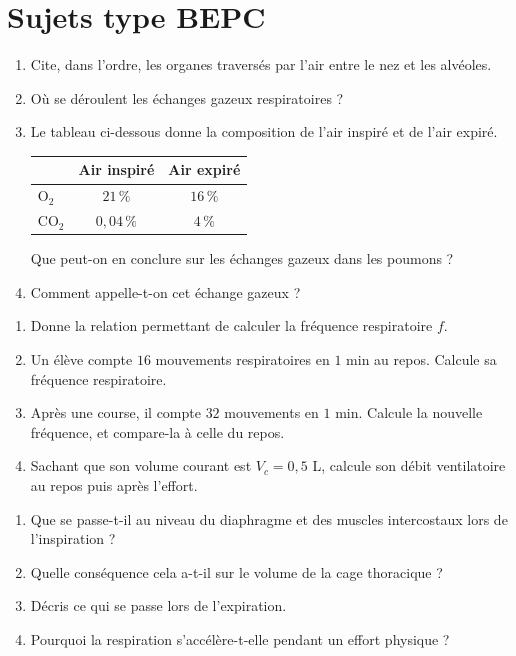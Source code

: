 \section{Sujets type BEPC}

\begin{enumerate}[label=\arabic*)]
\item Cite, dans l'ordre, les organes traversés par l'air entre le nez et les alvéoles.
\item Où se déroulent les échanges gazeux respiratoires ?
\item Le tableau ci-dessous donne la composition de l'air inspiré et de l'air expiré.
\begin{center}
\small
\begin{tabular}{lcc}
\toprule
& Air inspiré & Air expiré \\
\midrule
$\mathrm{O_2}$ & $21\,\%$ & $16\,\%$ \\
$\mathrm{CO_2}$ & $0{,}04\,\%$ & $4\,\%$ \\
\bottomrule
\end{tabular}
\end{center}
Que peut-on en conclure sur les échanges gazeux dans les poumons ?
\item Comment appelle-t-on cet échange gazeux ?
\end{enumerate}

\begin{enumerate}[label=\arabic*)]
\item Donne la relation permettant de calculer la fréquence respiratoire $f$.
\item Un élève compte $16$ mouvements respiratoires en $1$ min au repos. Calcule sa
fréquence respiratoire.
\item Après une course, il compte $32$ mouvements en $1$ min. Calcule la nouvelle
fréquence, et compare-la à celle du repos.
\item Sachant que son volume courant est $V_c=0{,}5$ L, calcule son débit ventilatoire
au repos puis après l'effort.
\end{enumerate}

\begin{enumerate}[label=\arabic*)]
\item Que se passe-t-il au niveau du diaphragme et des muscles intercostaux lors de
l'inspiration ?
\item Quelle conséquence cela a-t-il sur le volume de la cage thoracique ?
\item Décris ce qui se passe lors de l'expiration.
\item Pourquoi la respiration s'accélère-t-elle pendant un effort physique ?
\end{enumerate}

